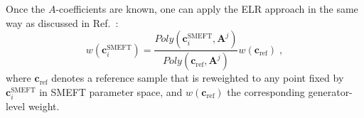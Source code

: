 Once the $A$-coefficients are known, one can apply the ELR approach in the same way as discussed in Ref.~\cite{ELR_R5}:
\begin{equation}\label{eq:reweightformula}
w(\mathbf{c}^{\text{SMEFT}}_i)=\frac{Poly(\mathbf{c}^{\text{SMEFT}}_i, \mathbf{A}^j)}{Poly(\mathbf{c}_{\text{ref}}, \mathbf{A}^j)}w(\mathbf{c}_{\text{ref}})\;,
\end{equation}
where $\mathbf{c}_{\text{ref}}$ denotes a reference sample that is reweighted to any point fixed by $\mathbf{c}^{\text{SMEFT}}_i$ in SMEFT parameter space, and $w(\mathbf{c}_{\text{ref}})$ the corresponding generator-level weight.





